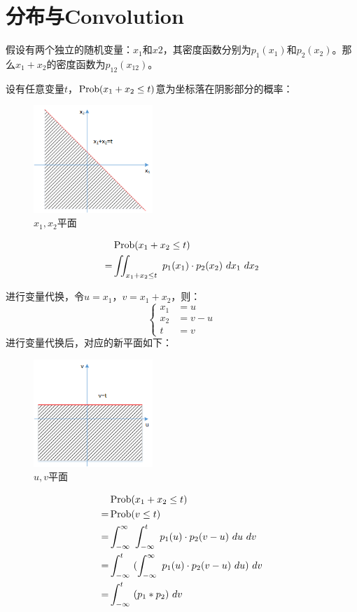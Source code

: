 \section{分布与Convolution}
假设有两个独立的随机变量：$x_1$和$x2$，其密度函数分别为$p_1(x_1)$和$p_2(x_2)$。那么$x_1+x_2$的密度函数为$p_{12}(x_{12})$。

设有任意变量$t$，$\operatorname{Prob}(x_1+x_2\leq t)$意为坐标落在阴影部分的概率：
\begin{figure}[H]
	\centering
	\includegraphics[width=0.4\textwidth]{assets/prob1.png}
	\caption{$x_1,x_2$平面}
\end{figure}
\begin{align*}
	  & \operatorname{Prob}(x_1+x_2\leq t)                                      \\
	= & \iint_{x_1+x_2\leq t}\ p_1(x_1)\cdot p_2(x_2)\ dx_1\ dx_2
\end{align*}

进行变量代换，令$u=x_1$，$v=x_1+x_2$，则：
$$
	\begin{cases}
		x_1 & =u   \\
		x_2 & =v-u \\
		t   & =v
	\end{cases}
$$
进行变量代换后，对应的新平面如下：
\begin{figure}[H]
	\centering
	\includegraphics[width=0.4\textwidth]{assets/prob2.png}
	\caption{$u,v$平面}
\end{figure}
\begin{align*}
	  & \operatorname{Prob}(x_1+x_2\leq t)                                                        \\
	= & \operatorname{Prob}(v\leq t)                                                              \\
	= & \int_{-\infty}^{\infty}\ \int_{-\infty}^{t}\ p_1(u)\cdot p_2(v-u)\ du\ dv   \\
	= & \int_{-\infty}^{t}\ (\int_{-\infty}^{\infty}\ p_1(u)\cdot p_2(v-u)\ du)\ dv \\
	= & \int_{-\infty}^{t}\ (p_1*p_2)\ dv
\end{align*}

